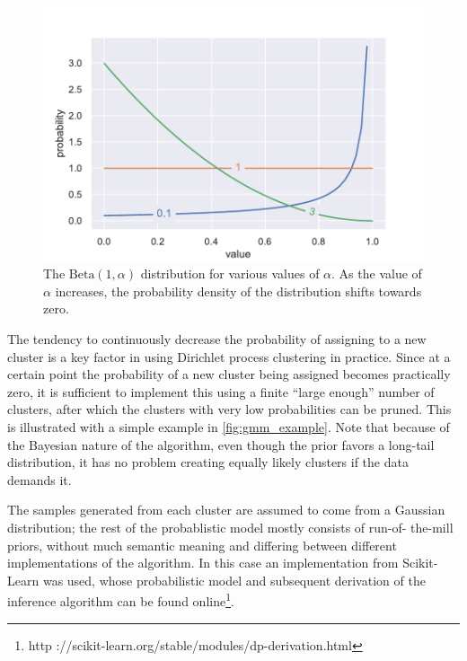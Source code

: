 \begin{figure}[tb]
  \centering
  \includegraphics[width=\textwidth]{figures/alpha.pdf}
  \caption{The $\mathrm{Beta}(1, \alpha)$ distribution for various
    values of $\alpha$. As the value of $\alpha$ increases, the probability
    density of the distribution shifts towards zero.\label{fig:alpha}}
\end{figure}

The tendency to continuously decrease the probability of assigning to a new
cluster is a key factor in using Dirichlet process clustering in practice.
Since at a certain point the probability of a new cluster being assigned
becomes practically zero, it is sufficient to implement this using a finite
``large enough'' number of clusters, after which the clusters with very low
probabilities can be pruned. This is illustrated with a simple example in
\cref{fig:gmm_example}. Note that because of the Bayesian nature of the
algorithm, even though the prior favors a long-tail distribution, it has no
problem creating equally likely clusters if the data demands it.

The samples generated from each cluster are assumed to come from a Gaussian
distribution; the rest of the probablistic model mostly consists of run-of-
the-mill priors, without much semantic meaning and differing between different
implementations of the algorithm. In this case an implementation from Scikit-
Learn\cite{scikit-learn} was used, whose probabilistic model and subsequent
derivation of the inference algorithm can be found online\footnote{http
://scikit-learn.org/stable/modules/dp-derivation.html}.

